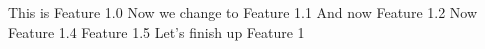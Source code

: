 This is Feature 1.0
Now we change to Feature 1.1
And now Feature 1.2
Now Feature 1.4
Feature 1.5
Let's finish up Feature 1
